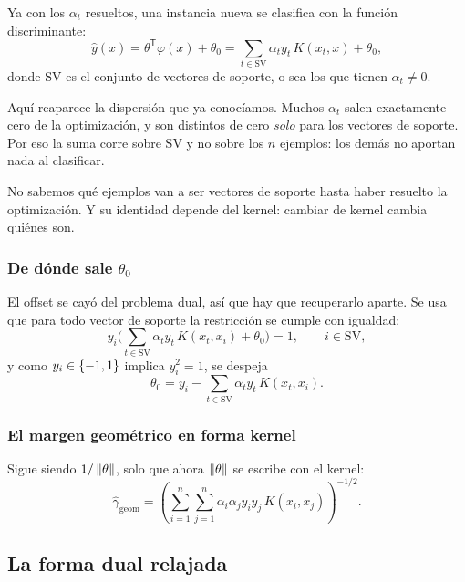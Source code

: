 \documentclass[11pt,letterpaper]{article}
\begin{document}
Ya con los $\alpha_t$ resueltos, una instancia nueva se clasifica con
la función discriminante:
\[
    \hat{y}(x) = \theta^{\mathsf{T}}\varphi(x) + \theta_0
    = \sum_{t \in \mathrm{SV}} \alpha_t y_t\, K(x_t, x) + \theta_0 ,
\]
donde $\mathrm{SV}$ es el conjunto de vectores de soporte, o sea los
que tienen $\alpha_t \neq 0$.

\begin{idea}
  Aquí reaparece la dispersión que ya conocíamos. Muchos $\alpha_t$
  salen exactamente cero de la optimización, y son distintos de cero
  \emph{solo} para los vectores de soporte. Por eso la suma corre
  sobre $\mathrm{SV}$ y no sobre los $n$ ejemplos: los demás no
  aportan nada al clasificar.
\end{idea}

\begin{ojo}
  No sabemos qué ejemplos van a ser vectores de soporte hasta haber
  resuelto la optimización. Y su identidad depende del kernel: cambiar
  de kernel cambia quiénes son.
\end{ojo}

\subsubsection*{De dónde sale $\theta_0$}

El offset se cayó del problema dual, así que hay que recuperarlo
aparte. Se usa que para todo vector de soporte la restricción se
cumple con igualdad:
\[
    y_i\Big(\sum_{t \in \mathrm{SV}} \alpha_t y_t\, K(x_t, x_i)
    + \theta_0\Big) = 1 ,
    \qquad i \in \mathrm{SV} ,
\]
y como $y_i \in \left\{ -1, 1 \right\}$ implica $y_i^{2} = 1$, se despeja
\[
    \theta_0 = y_i - \sum_{t \in \mathrm{SV}}
    \alpha_t y_t\, K(x_t, x_i) .
\]

\subsubsection*{El margen geométrico en forma kernel}

Sigue siendo $1/\left\lVert \theta \right\rVert$, solo que ahora $\left\lVert \theta \right\rVert$ se
escribe con el kernel:
\[
    \hat{\gamma}_{\mathrm{geom}} = \left(
    \sum_{i=1}^{n} \sum_{j=1}^{n}
    \alpha_i \alpha_j y_i y_j\, K(x_i, x_j)
    \right)^{-1/2} .
\]


\subsection*{La forma dual relajada}
\end{document}

